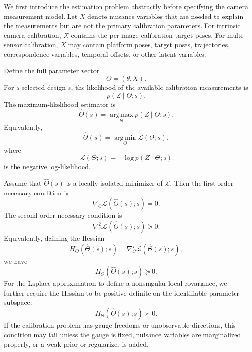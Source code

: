 \documentclass[letterpaper, 9
 pt, conference]{ieeeconf}
\begin{document}
We first introduce the estimation problem abstractly before specifying the camera measurement model. Let $X$ denote nuisance variables that are needed to explain the measurements but are not the primary calibration parameters. For intrinsic camera calibration, $X$ contains the per-image calibration target poses. For multi-sensor calibration, $X$ may contain platform poses, target poses, trajectories, correspondence variables, temporal offsets, or other latent variables.

Define the full parameter vector
\begin{equation}
    \Theta=(\theta,X).
\end{equation}
For a selected design $s$, the likelihood of the available calibration measurements is
\begin{equation}
    p(Z\mid \Theta;s).
\end{equation}
The maximum-likelihood estimator is
\begin{equation}
    \hat{\Theta}(s)
    =
    \operatorname*{arg\,max}_{\Theta}
    p(Z\mid \Theta;s).
\end{equation}
Equivalently,
\begin{equation}
    \hat{\Theta}(s)
    =
    \operatorname*{arg\,min}_{\Theta}
    \mathcal{L}(\Theta;s),
\end{equation}
where
\begin{equation}
    \mathcal{L}(\Theta;s)
    =
    -\log p(Z\mid \Theta;s)
\end{equation}
is the negative log-likelihood.

Assume that $\hat{\Theta}(s)$ is a locally isolated minimizer of $\mathcal{L}$. Then the first-order necessary condition is
\begin{equation}
    \nabla_{\Theta}\mathcal{L}(\hat{\Theta}(s);s)=0.
\end{equation}
The second-order necessary condition is
\begin{equation}
    \nabla_{\Theta}^{2}\mathcal{L}(\hat{\Theta}(s);s)\succeq 0.
\end{equation}
Equivalently, defining the Hessian
\begin{equation}
    H_{\Theta}(\hat{\Theta}(s);s)
    =
    \nabla_{\Theta}^{2}
    \mathcal{L}(\hat{\Theta}(s);s),
\end{equation}
we have
\begin{equation}
    H_{\Theta}(\hat{\Theta}(s);s)\succeq 0.
\end{equation}
For the Laplace approximation to define a nonsingular local covariance, we further require the Hessian to be positive definite on the identifiable parameter subspace:
\begin{equation}
    H_{\Theta}(\hat{\Theta}(s);s)\succ 0.
\end{equation}
If the calibration problem has gauge freedoms or unobservable directions, this condition may fail unless the gauge is fixed, nuisance variables are marginalized properly, or a weak prior or regularizer is added.
\end{document}
